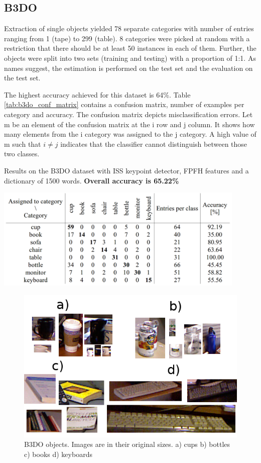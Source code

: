 	
	\subsection{B3DO}
	Extraction of single objects yielded 78 separate categories with number of entries ranging from 1 (tape) to 299 (table). 8 categories were picked at random with a restriction that there should be at least 50 instances in each of them. Further, the objects were split into two sets (training and testing) with a proportion of 1:1. As names suggest, the estimation is performed on the test set and the evaluation on the test set.
	
	The highest accuracy achieved for this dataset is 64\%. Table \ref{tab:b3do_conf_matrix} contains a confusion matrix, number of examples per category and accuracy. The confusion matrix depicts misclassification errors. Let m be an element of the confusion matrix at the i row and j column. It shows how many elements from the i category was assigned to the j category. A high value of m such that $i \neq j$ indicates that the classifier cannot distinguish between those two classes.
	
	\begin{table}[!ht]
	\centering
	\caption{Results on the B3DO dataset with ISS keypoint detector, FPFH features and a dictionary of 1500 words. \textbf{Overall accuracy is 65.22\%}}
	\includegraphics[width=0.9\textwidth]{figs/b3do_conf_matrix}	
	\label{tab:b3do_conf_matrix}
	\end{table}
	
	\begin{figure}[!ht]
	\centering	
	\includegraphics[width=.75\textwidth]{figs/b3do_objects}
	\caption{B3DO objects. Images are in their original sizes. a) cups b) bottles c) books d) keyboards}
	\label{fig:b3do_objects}
	\end{figure}
	
